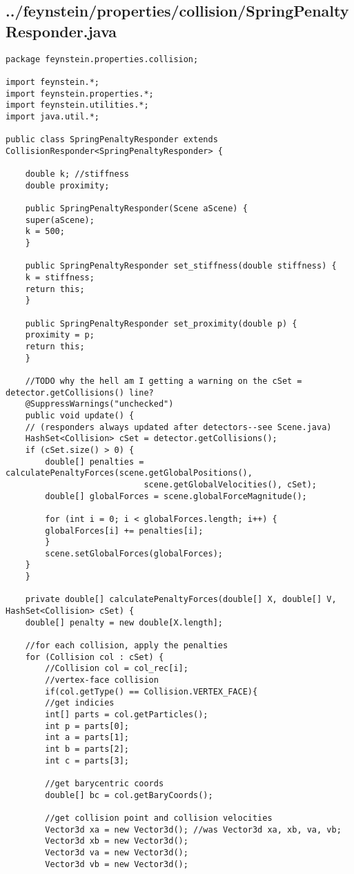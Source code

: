 \subsection*{../feynstein/properties/collision/SpringPenaltyResponder.java}
\begin{lstlisting}
package feynstein.properties.collision;

import feynstein.*;
import feynstein.properties.*;
import feynstein.utilities.*;
import java.util.*;

public class SpringPenaltyResponder extends CollisionResponder<SpringPenaltyResponder> {
    
    double k; //stiffness
    double proximity;

    public SpringPenaltyResponder(Scene aScene) {
	super(aScene);
	k = 500;
    }

    public SpringPenaltyResponder set_stiffness(double stiffness) {
	k = stiffness;
	return this;
    }

    public SpringPenaltyResponder set_proximity(double p) {
	proximity = p;
	return this;
    }

    //TODO why the hell am I getting a warning on the cSet = detector.getCollisions() line?
    @SuppressWarnings("unchecked")
    public void update() {
	// (responders always updated after detectors--see Scene.java)
	HashSet<Collision> cSet = detector.getCollisions();
	if (cSet.size() > 0) {
	    double[] penalties = calculatePenaltyForces(scene.getGlobalPositions(), 
							scene.getGlobalVelocities(), cSet);
	    double[] globalForces = scene.globalForceMagnitude();

	    for (int i = 0; i < globalForces.length; i++) {
		globalForces[i] += penalties[i];
	    }
	    scene.setGlobalForces(globalForces);
	}
    }

    private double[] calculatePenaltyForces(double[] X, double[] V, HashSet<Collision> cSet) {
	double[] penalty = new double[X.length];

	//for each collision, apply the penalties
	for (Collision col : cSet) {
	    //Collision col = col_rec[i];
	    //vertex-face collision
	    if(col.getType() == Collision.VERTEX_FACE){
		//get indicies
		int[] parts = col.getParticles();
		int p = parts[0];
		int a = parts[1]; 
		int b = parts[2]; 
		int c = parts[3];

		//get barycentric coords
		double[] bc = col.getBaryCoords();

		//get collision point and collision velocities
		Vector3d xa = new Vector3d(); //was Vector3d xa, xb, va, vb;
		Vector3d xb = new Vector3d();
		Vector3d va = new Vector3d();
		Vector3d vb = new Vector3d();


\end{lstlisting}
